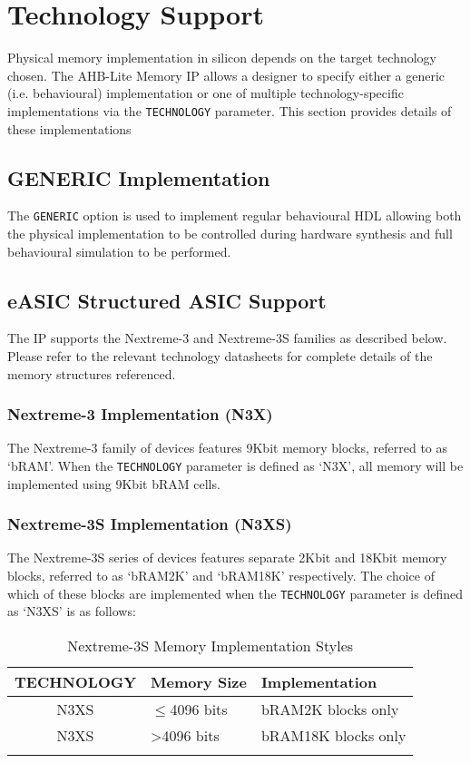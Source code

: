 \chapter{Technology Support} \label{technology-support}

Physical memory implementation in silicon depends on the target
technology chosen. The AHB-Lite Memory IP allows a designer to
specify either a generic (i.e. behavioural) implementation or one 
of multiple technology-specific implementations via the \texttt{TECHNOLOGY} 
parameter. This section provides details of these implementations

 \section{GENERIC Implementation} \label{generic-implementation}

The \texttt{GENERIC} option is used to implement regular behavioural HDL allowing
both the physical implementation to be controlled during hardware
synthesis and full behavioural simulation to be performed.

 \section{eASIC Structured ASIC Support} \label{easic-structured-asic-support}

The IP supports the Nextreme-3 and Nextreme-3S families as described
below. Please refer to the relevant technology datasheets for complete
details of the memory structures referenced.

 \subsection{Nextreme-3 Implementation (N3X)} \label{nextreme-3-implementation-n3x}

The Nextreme-3 family of devices features 9Kbit memory blocks, referred
to as `bRAM'. When the \texttt{TECHNOLOGY} parameter is defined as `N3X', all
memory will be implemented using 9Kbit bRAM cells.

 \subsection{Nextreme-3S Implementation (N3XS)} \label{nextreme-3s-implementation-n3xs}

The Nextreme-3S series of devices features separate 2Kbit and 18Kbit
memory blocks, referred to as `bRAM2K' and `bRAM18K' respectively. The
choice of which of these blocks are implemented when the \texttt{TECHNOLOGY}
parameter is defined as `N3XS' is as follows:

\begin{longtable}[]{@{}cll@{}}
	\toprule
	TECHNOLOGY & Memory Size & Implementation\tabularnewline
	\midrule
	\endhead
	N3XS & $\leqslant$4096 bits & bRAM2K blocks only\tabularnewline
	N3XS & \textgreater{}4096 bits & bRAM18K blocks only\tabularnewline
	\bottomrule
	\caption{Nextreme-3S Memory Implementation Styles}
\end{longtable}
